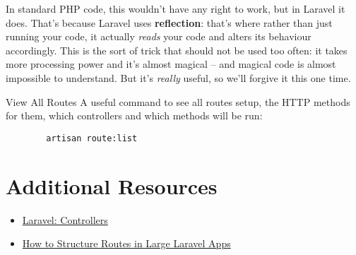 In standard PHP code, this wouldn't have any right to work, but in Laravel it does. That's because Laravel uses \textbf{reflection}: that's where rather than just running your code, it actually \textit{reads} your code and alters its behaviour accordingly. This is the sort of trick that should not be used too often: it takes more processing power and it's almost magical – and magical code is almost impossible to understand. But it's \textit{really} useful, so we'll forgive it this one time.

\pagebreak

\begin{infobox}{View All Routes}
    A useful command to see all routes setup, the HTTP methods for them, which controllers and which methods will be run:

    \begin{verbatim}
        artisan route:list
    \end{verbatim}

\end{infobox}




\section{Additional Resources}

\begin{itemize}[leftmargin=*]
    \item \href{http://laravel.com/docs/master/controllers}{Laravel: Controllers}
    \item \href{https://laraveldaily.com/how-to-structure-routes-in-large-laravel-projects/}{How to Structure Routes in Large Laravel Apps}
\end{itemize}
